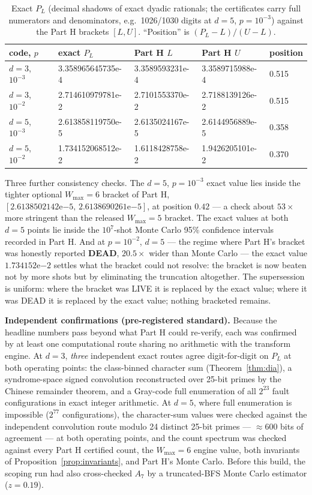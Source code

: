 \documentclass[11pt]{amsart}
\newcommand{\PL}{P_{L}}
\theoremstyle{plain}
\theoremstyle{definition}
\theoremstyle{remark}
\begin{document}
\begin{table}[ht]
\centering
\caption{Exact $\PL$ (decimal shadows of exact dyadic rationals; the
certificates carry full numerators and denominators, e.g.\ 1026/1030 digits
at $d{=}5$, $p{=}10^{-3}$) against the Part H brackets $[L, U]$. ``Position''
is $(\PL - L)/(U - L)$.}
\label{tab:exact}
\begin{tabular}{lllll}
\toprule
code, $p$ & exact $\PL$ & Part H $L$ & Part H $U$ & position \\
\midrule
$d{=}3$, $10^{-3}$ & 3.358965645735e-4 & 3.3589593231e-4 & 3.3589715988e-4 & 0.515 \\
$d{=}3$, $10^{-2}$ & 2.714610979781e-2 & 2.7101553370e-2 & 2.7188139126e-2 & 0.515 \\
$d{=}5$, $10^{-3}$ & 2.613858119750e-5 & 2.6135024167e-5 & 2.6144956889e-5 & 0.358 \\
$d{=}5$, $10^{-2}$ & 1.734152068512e-2 & 1.6118428758e-2 & 1.9426205101e-2 & 0.370 \\
\bottomrule
\end{tabular}
\end{table}

Three further consistency checks. The $d{=}5$, $p = 10^{-3}$ exact value
lies inside the tighter optional $W_{\max}{=}6$ bracket of Part H,
$[2.6138502142\mathrm{e}{-5},\, 2.6138690261\mathrm{e}{-5}]$, at position
$0.42$ --- a check about $53\times$ more stringent than the released
$W_{\max}{=}5$ bracket. The exact values at both $d=5$ points lie inside the
$10^7$-shot Monte Carlo 95\% confidence intervals recorded in Part H. And at
$p = 10^{-2}$, $d = 5$ --- the regime where Part H's bracket was honestly
reported \textbf{DEAD}, $20.5\times$ wider than Monte Carlo --- the exact
value $1.734152\mathrm{e}{-2}$ settles what the bracket could not resolve:
the bracket is now beaten not by more shots but by eliminating the
truncation altogether. The supersession is uniform: where the bracket was
LIVE it is replaced by the exact value; where it was DEAD it is replaced by
the exact value; nothing bracketed remains.

\textbf{Independent confirmations (pre-registered standard).} Because the
headline numbers pass beyond what Part H could re-verify, each was confirmed
by at least one computational route sharing no arithmetic with the transform
engine. At $d = 3$, \emph{three} independent exact routes agree digit-for-digit
on $\PL$ at both operating points: the class-binned character sum
(Theorem~\ref{thm:dia}), a syndrome-space signed convolution reconstructed
over 25-bit primes by the Chinese remainder theorem, and a Gray-code full
enumeration of all $2^{23}$ fault configurations in exact integer
arithmetic. At $d = 5$, where full enumeration is impossible ($2^{77}$
configurations), the character-sum values were checked against the
independent convolution route modulo 24 distinct 25-bit primes ---
$\approx 600$ bits of agreement --- at both operating points, and the count
spectrum was checked against every Part H certified count, the $W_{\max}=6$
engine value, both invariants of Proposition~\ref{prop:invariants}, and Part
H's Monte Carlo. Before this build, the scoping run had also cross-checked
$A_7$ by a truncated-BFS Monte Carlo estimator ($z = 0.19$).
\end{document}
